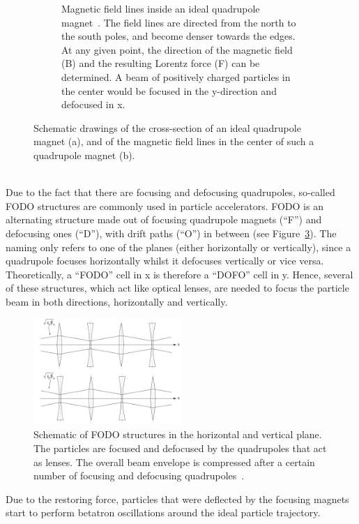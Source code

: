 \begin{figure}
\begin{subfigure}[t]{0.49\textwidth}
\caption[Magnetic field in an ideal quadrupole magnet]{Magnetic field lines inside an ideal quadrupole magnet~\cite{QuadrupoleField}.
The field lines are directed from the north to the south poles, and become denser towards the edges.
At any given point, the direction of the magnetic field (B) and the resulting Lorentz force (F) can be determined.
A beam of positively charged particles in the center would be focused in the y-direction and defocused in x.}
\label{fig:Quadrupole:field_lines}
\end{subfigure}
\caption[Schematic drawings of a quadrupole magnet]{Schematic drawings of the cross-section of an ideal quadrupole magnet (a), and of the magnetic field lines in the center of such a quadrupole magnet (b).}
\label{fig:Quadrupole}
\end{figure}
\\
Due to the fact that there are focusing and defocusing quadrupoles, so-called FODO structures are commonly used in particle accelerators.
FODO is an alternating structure made out of focusing quadrupole magnets (``F'') and defocusing ones (``D''), with drift paths (``O'') in between (see Figure~\ref{fig:FODO}).
The naming only refers to one of the planes (either horizontally or vertically), since a quadrupole focuses horizontally whilst it defocuses vertically or vice versa.
Theoretically, a ``FODO'' cell in x is therefore a ``DOFO'' cell in y.
Hence, several of these structures, which act like optical lenses, are needed to focus the particle beam in both directions, horizontally and vertically.
\begin{figure}
\centering
\includegraphics[width=0.5\textwidth]{Figures/FODO.png}
\caption[Schematic of FODO structure]{Schematic of FODO structures in the horizontal and vertical plane. The particles are focused and defocused by the quadrupoles that act as lenses. The overall beam envelope is compressed after a certain number of focusing and defocusing quadrupoles~\cite[p. 65]{Hinterberger}.}
\label{fig:FODO}
\end{figure}
Due to the restoring force, particles that were deflected by the focusing magnets start to perform betatron oscillations around the ideal particle trajectory.

